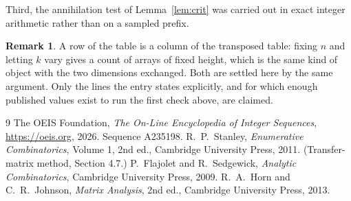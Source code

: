 \documentclass[11pt,a4paper]{article}
\theoremstyle{plain}
\theoremstyle{definition}
\newtheorem{remark}[theorem]{Remark}
\begin{document}
Third, the annihilation test of Lemma~\ref{lem:crit} was carried out in exact integer
arithmetic rather than on a sampled prefix.

\begin{remark}
A row of the table is a column of the transposed table: fixing $n$ and letting $k$ vary gives a
count of arrays of fixed height, which is the same kind of object with the two dimensions
exchanged. Both are settled here by the same argument. Only the lines the entry states
explicitly, and for which enough published values exist to run the first check above, are
claimed.
\end{remark}

\begin{thebibliography}{9}
 The OEIS Foundation, \emph{The On-Line Encyclopedia of Integer
Sequences}, \url{https://oeis.org}, 2026. Sequence A235198.
 R.~P.~Stanley, \emph{Enumerative Combinatorics}, Volume 1, 2nd ed.,
Cambridge University Press, 2011. (Transfer-matrix method, Section 4.7.)
 P.~Flajolet and R.~Sedgewick, \emph{Analytic Combinatorics}, Cambridge
University Press, 2009.
 R.~A.~Horn and C.~R.~Johnson, \emph{Matrix Analysis}, 2nd ed., Cambridge
University Press, 2013.
\end{thebibliography}
\end{document}
